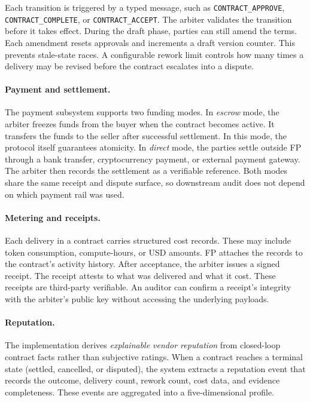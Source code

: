 \noindent Each transition is triggered by a typed message, such as \texttt{CONTRACT\_APPROVE}, \texttt{CONTRACT\_COMPLETE}, or \texttt{CONTRACT\_ACCEPT}. The arbiter validates the transition before it takes effect. During the draft phase, parties can still amend the terms. Each amendment resets approvals and increments a draft version counter. This prevents stale-state races. A configurable rework limit controls how many times a delivery may be revised before the contract escalates into a dispute.

\paragraph{Payment and settlement.}
The payment subsystem supports two funding modes. In \emph{escrow} mode, the arbiter freezes funds from the buyer when the contract becomes active. It transfers the funds to the seller after successful settlement. In this mode, the protocol itself guarantees atomicity.
In \emph{direct} mode, the parties settle outside FP through a bank transfer, cryptocurrency payment, or external payment gateway. The arbiter then records the settlement as a verifiable reference. Both modes share the same receipt and dispute surface, so downstream audit does not depend on which payment rail was used.

\paragraph{Metering and receipts.}
Each delivery in a contract carries structured cost records. These may include token consumption, compute-hours, or USD amounts. FP attaches the records to the contract's activity history. After acceptance, the arbiter issues a signed receipt. The receipt attests to what was delivered and what it cost.
These receipts are third-party verifiable. An auditor can confirm a receipt's integrity with the arbiter's public key without accessing the underlying payloads.

\paragraph{Reputation.}
The implementation derives \emph{explainable vendor reputation} from
closed-loop contract facts rather than subjective ratings.  When a
contract reaches a terminal state (settled, cancelled, or disputed), the
system extracts a reputation event that records the outcome, delivery
count, rework count, cost data, and evidence completeness.  These events
are aggregated into a five-dimensional profile.

